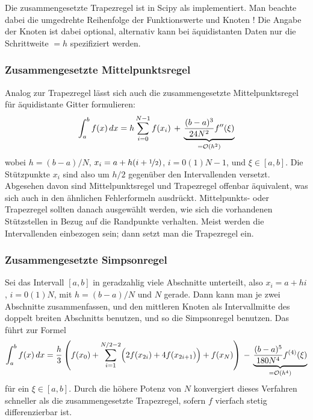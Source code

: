 Die zusammengesetzte Trapezregel ist in Scipy als
 implementiert. Man beachte dabei
die umgedrehte Reihenfolge der Funktionswerte  und Knoten
! Die Angabe der Knoten ist dabei optional, alternativ kann
bei äquidistanten Daten nur die Schrittweite $=h$
spezifiziert werden.

\subsubsection{Zusammengesetzte Mittelpunktsregel}

Analog zur Trapezregel lässt sich auch die zusammengesetzte
Mittelpunktsregel für äquidistante Gitter formulieren:
\begin{equation}
  \int_a^b f(x)\, dx =
  h\sum_{i=0}^{N-1} f(x_i) 
  \,+\, \underbrace{\frac{(b-a)^3}{24 N^2}f''(\xi)}_{=\mathcal O(h^2)}
\end{equation}
wobei $h=(b-a)/N$, $x_i = a + h(i+\nicefrac{1}{2})$, $i=0(1)N-1$, und
$\xi\in [a,b]$. Die Stützpunkte $x_i$ sind also um $h/2$ gegenüber den
Intervallenden versetzt. Abgesehen davon sind Mittelpunktsregel und
Trapezregel offenbar äquivalent, was sich auch in den ähnlichen
Fehlerformeln ausdrückt. Mittelpunkts- oder Trapezregel sollten danach
ausgewählt werden, wie sich die vorhandenen Stützstellen in Bezug auf
die Randpunkte verhalten. Meist werden die Intervallenden einbezogen
sein; dann setzt man die Trapezregel ein.

\subsubsection{Zusammengesetzte Simpsonregel}

Sei das Intervall $[a,b]$ in geradzahlig viele Abschnitte unterteilt,
also $x_i = a + hi$, $i=0(1)N$, mit $h=(b-a)/N$ und $N$ gerade. Dann
kann man je zwei Abschnitte zusammenfassen, und den mittleren Knoten
als Intervallmitte des doppelt breiten Abschnitts benutzen, und so die
Simpsonregel benutzen. Das führt zur Formel
\begin{equation}
  \int_a^b f(x)\, dx =
  \frac{h}{3}\left(
    f(x_0) +
    \sum_{i=1}^{N/2-2} \Bigl(2 f(x_{2i}) + 4 f(x_{2i+1})\Bigr)
    + f(x_N)
  \right)
  \, - \, \underbrace{\frac{(b-a)^5}{180 N^4} f^{(4)}(\xi)}_{=\mathcal O(h^4)}
\end{equation}
für ein $\xi\in [a,b]$. Durch die höhere Potenz von $N$ konvergiert
dieses Verfahren schneller als die zusammengesetzte Trapezregel,
sofern $f$ vierfach stetig differenzierbar ist.

